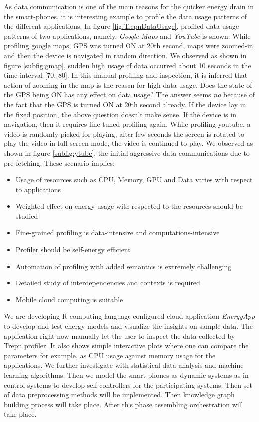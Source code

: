 As data communication is one of the main reasons for the quicker energy drain in the smart-phones, it is interesting example to profile the data usage patterns of the different applications. In figure \ref{fig:TrepnDataUsage}, profiled data usage patterns of two applications, namely, \textit{Google Maps} and \textit{YouTube} is shown. While profiling google maps, GPS was turned ON at 20th second, maps were zoomed-in and then the device is navigated in random direction. We observed as shown in figure \ref{subfig:gmap}, sudden high usage of data occurred about 10 seconds in the time interval [70, 80]. In this manual profiling and inspection, it is inferred that action of zooming-in the map is the reason for high data usage. Does the state of the GPS being ON has any effect on data usage? The answer seems \emph{no} because of the fact that the GPS is turned ON at 20th second already. If the device lay in the fixed position, the above question doesn't make sense. If the device is in navigation, then it requires fine-tuned profiling again. While profiling youtube, a video is randomly picked for playing, after few seconds the screen is rotated to play the video in full screen mode, the video is continued to play. We observed as shown in figure \ref{subfig:ytube}, the initial aggressive data communications due to pre-fetching. 
These scenario implies: 
\begin{itemize}
\item Usage of resources such as CPU, Memory, GPU and Data varies with respect to applications
\item Weighted effect on energy usage with respected to the resources should be studied
\item Fine-grained profiling is data-intensive and computations-intensive
\item Profiler should be self-energy efficient
\item Automation of profiling with added semantics is extremely challenging
\item Detailed study of interdependencies and contexts is required
\item Mobile cloud computing is suitable
\end{itemize}

We are developing R computing language configured cloud application \emph{EnergyApp} to develop and test energy models and visualize the insights on sample data. The application right now manually let the user to inspect the data collected by Trepn profiler. It also shows simple interactive plots where one can compare the parameters for example, as CPU usage against memory usage for the applications. We further investigate with statistical data analysis and machine learning algorithms. Then we model the smart-phones as dynamic systems as in control systems to develop self-controllers for the participating systems. Then set of data preprocessing methods will be implemented. Then knowledge graph building process will take place. After this phase assembling orchestration will take place. 
